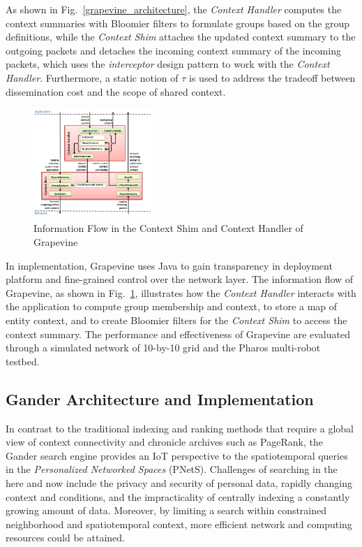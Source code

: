 \documentclass[11pt,onecolumn]{article}
\begin{document}
As shown in Fig.~\ref{grapevine_architecture}, the {\em Context Handler} computes the context summaries with Bloomier filters to formulate groups based on the group definitions, while the {\em Context Shim} attaches the updated context summary to the outgoing packets and detaches the incoming context summary of the incoming packets, which uses the {\em interceptor} design pattern to work with the {\em Context Handler}. Furthermore, a static notion of $\tau$ is used to address the tradeoff between dissemination cost and the scope of shared context.

\begin{figure}
  \begin{center}
    \includegraphics[width=0.4\textwidth]{resources/grapevine_implementation.png}
  \end{center}
  \vspace{-20pt}
  \caption{Information Flow in the Context Shim and Context Handler of Grapevine \cite{grapevine} \label{grapevine_flow}}
    \vspace{-20pt}
\end{figure}

In implementation, Grapevine uses Java to gain transparency in deployment platform and fine-grained control over the network layer. The information flow of Grapevine, as shown in Fig.~\ref{grapevine_flow}, illustrates how the {\em Context Handler} interacts with the application to compute group membership and context, to store a map of entity context, and to create Bloomier filters for the {\em Context Shim} to access the context summary. The performance and effectiveness of Grapevine are evaluated through a simulated network of 10-by-10 grid and the Pharos multi-robot testbed\cite{agmon2008multi}.


\subsection{Gander Architecture and Implementation}
In contrast to the traditional indexing and ranking methods that require a global view of context connectivity and chronicle archives such as PageRank\cite{page1999pagerank}, the Gander search engine \cite{michel2013gander} provides an IoT perspective to the spatiotemporal queries in the {\em Personalized Networked Spaces} (PNetS). Challenges of searching in the here and now include the privacy and security of personal data, rapidly changing context and conditions, and the impracticality of centrally indexing a constantly growing amount of data. Moreover, by limiting a search within constrained neighborhood and spatiotemporal context, more efficient network and computing resources could be attained.
\end{document}

